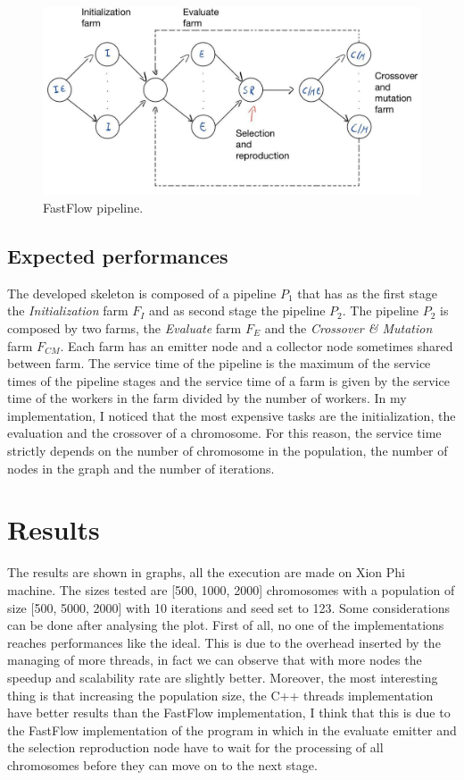 \documentclass[a4paper,10pt]{article}
\begin{document}
	\begin{figure}[H]
		\centering
		\includegraphics[width=\linewidth]{img/ff_pipeline.jpg}
		\caption{FastFlow pipeline.}
		\label{ff:pipeline}
	\end{figure}
	
	\subsection{Expected performances}
	The developed skeleton is composed of a pipeline $P_{1}$ that has as the first stage the \textit{Initialization} farm $F_{I}$ and as second stage the pipeline $P_{2}$.
	The pipeline $P_{2}$ is composed by two farms, the \textit{Evaluate} farm $F_{E}$ and the \textit{Crossover \& Mutation} farm $F_{CM}$. Each farm has an emitter node and a collector node sometimes shared between farm.
	The service time of the pipeline is the maximum of the service times of the pipeline stages and the service time of a farm is given by the service time of the workers in the farm divided by the number of workers.
	In my implementation, I noticed that the most expensive tasks are the initialization, the evaluation and the crossover of a chromosome. For this reason, the service time strictly depends on the number of chromosome in the population, the number of nodes in the graph and the number of iterations. 

	\section{Results}
	The results are shown in graphs, all the execution are made on Xion Phi machine. The sizes tested are [500, 1000, 2000] chromosomes with a population of size [500, 5000, 2000] with 10 iterations and seed set to 123.
	Some considerations can be done after analysing the plot. First of all, no one of the implementations reaches performances like the ideal. This is due to the overhead inserted by the managing of more threads, in fact we can observe that with more nodes the speedup and scalability rate are slightly better. Moreover, the most interesting thing is that increasing  the population size, the C++ threads implementation have better results than the FastFlow implementation, I think that this is due to the FastFlow implementation of the program in which in the evaluate emitter and the selection reproduction node have to wait for the processing of all chromosomes before they can move on to the next stage. 
	
\end{document}
